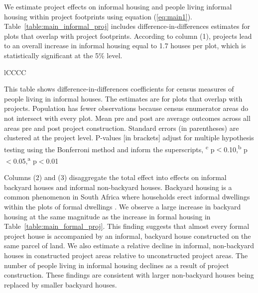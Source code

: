 \documentclass[12pt]{article}
\newcommand{\regtextfirst}{
Mean pre and post are average outcomes across all areas pre and post project construction.  Standard errors (in parentheses) are clustered at the project level.  P-values [in brackets] adjust for multiple hypothesis testing using the Bonferroni method and inform the superscripts, \textsuperscript{c} p$<$0.10,\textsuperscript{b} p$<$0.05,\textsuperscript{a} p$<$0.01 \,\,
}
\newcommand{\rv}{}
\begin{document}
\rv{We estimate project effects on informal housing and people living informal housing within project footprints using equation (\ref{eq:main1}).  Table~\ref{table:main_informal_proj} includes difference-in-differences estimates for plots that overlap with project footprints.  According to column (1), projects lead to an overall increase in informal housing equal to 1.7 houses per plot, which is statistically significant at the 5\% level. }

\begin{table}[h!]
\small
\centering
\caption{Direct Effects on Informal Housing and Inhabitants}\label{table:main_informal_proj}
\vspace{-2mm}
\begin{threeparttable}
\begin{tabular}{lCCCC}
\toprule

\bottomrule
\end{tabular}
\begin{tablenotes}
\item \footnotesize 
 This table shows difference-in-differences coefficients for census measures of people living in informal houses.  The estimates are for plots that overlap with projects. Population has fewer observations because census enumerator areas do not intersect with every plot.   \regtextfirst
\end{tablenotes}
\end{threeparttable}
\end{table}

\rv{Columns (2) and (3) disaggregate the total effect into effects on informal backyard houses and informal non-backyard houses.  Backyard housing is a common phenomenon in South Africa where households erect informal dwellings within the plots of formal dwellings \citep{Brueckner2018backyarding}.  We observe a large increase in backyard housing at the same magnitude as the increase in formal housing in Table~\ref{table:main_formal_proj}.  This finding suggests that almost every formal project house is accompanied by an informal, backyard house constructed on the same parcel of land.  We also estimate a relative decline in informal, non-backyard houses in constructed project areas relative to unconstructed project areas.  The number of people living in informal housing declines as a result of project construction.  These findings are consistent with larger non-backyard houses being replaced by smaller backyard houses.}
\end{document}
